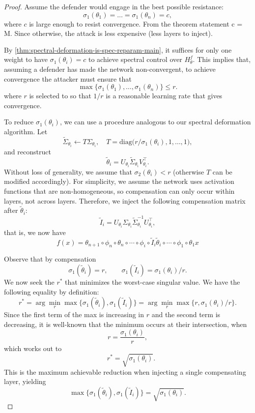 \documentclass{article}
\theoremstyle{plain}
\theoremstyle{definition}
\theoremstyle{remark}
\begin{document}
\begin{proof}
Assume the defender would engage in the best possible resistance:
\[
\sigma_1(\theta_1) = \dots = \sigma_1(\theta_n) = c,
\]
where $c$ is large enough to resist convergence. From the theorem statement c = M. Since otherwise, the attack is less expensive (less layers to inject).

By \cref{thm:spectral-deformation-is-spec-reparam-main}, it suffices for only one weight to have $\sigma_1(\theta_i) = c$ to achieve spectral control over $H^f_{\theta}$. This implies that, assuming a defender has made the network non-convergent, to achieve convergence the attacker must ensure that
\[
\max\{\sigma_1(\theta_1), \dots, \sigma_1(\theta_n)\} \le r.
\]
where $r$ is selected to so that $1/r$ is a reasonable learning rate that gives convergence.

To reduce $\sigma_1(\theta_i)$, we can use a procedure analogous to our spectral deformation algorithm. Let
\[
\tilde{\Sigma}_{\theta_i} \gets T \Sigma_{\theta_i}, \quad T = \mathrm{diag}\bigl(r/\sigma_1(\theta_i), 1, \dots, 1\bigr),
\]
and reconstruct
\[
\tilde{\theta}_i = U_{\theta_i} \tilde{\Sigma}_{\theta_i} V_{\theta_i}^{\top}.
\]
Without loss of generality, we assume that $\sigma_2(\theta_i) < r$ (otherwise $T$ can be modified accordingly). For simplicity, we assume the network uses activation functions that are non-homogeneous, so compensation can only occur within layers, not across layers. Therefore, we inject the following compensation matrix after $\tilde{\theta}_i$:
\[
\tilde{I}_{i} = U_{\theta_i} \Sigma_{\theta_i} \tilde{\Sigma}_{\theta_i}^{-1} U_{\theta_i}^{\top},
\]
that is, we now have \[
f(x) = \theta_{n+1} \circ \phi_{n} \circ \theta_{n} \circ \cdots \circ \phi_{i} \circ \tilde{I}_{i} \tilde{\theta}_i \circ \cdots  \circ \phi_1 \circ \theta_1x
\]

Observe that by compensation
\[
\sigma_1(\tilde{\theta}_i) = r, \qquad \sigma_1(\tilde{I}_{i}) = \sigma_1(\theta_i)/r.
\]
We now seek the $r^*$ that minimizes the worst-case singular value. We have the following equality by definition:
\[
r^* = \arg\min_r \max\{\sigma_1(\tilde{\theta}_i), \sigma_1(\tilde{I}_{i})\} = \arg\min_r \max\{r, \sigma_1(\theta_i)/r\}.
\]
Since the first term of the max is increasing in $r$ and the second term is decreasing, it is well-known that the minimum occurs at their intersection, when \[
r = \frac{\sigma_1(\theta_i)}{r},
\] which works out to
\[
\quad r^* = \sqrt{\sigma_1(\theta_i)}.
\]
This is the maximum achievable reduction when injecting a single compensating layer, yielding
\[
\max\{\sigma_1(\tilde{\theta}_i), \sigma_1(\tilde{I}_{i})\} = \sqrt{\sigma_1(\theta_i)}.
\]


\end{proof}
\end{document}
